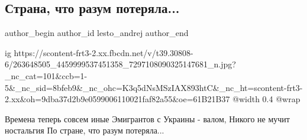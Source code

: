  
 
 
 
 
 
\subsection{Страна, что разум потеряла...}
\label{sec:03_12_2021.fb.lesto_andrej.1.strana_chto_razum_potjerjala}
 
\ifcmt
 author_begin
   author_id lesto_andrej
 author_end
\fi

\ifcmt
  ig https://scontent-frt3-2.xx.fbcdn.net/v/t39.30808-6/263648505_4459999537451358_7297108090325147681_n.jpg?_nc_cat=101&ccb=1-5&_nc_sid=8bfeb9&_nc_ohc=K3q5dNsMSzIAX893htC&_nc_ht=scontent-frt3-2.xx&oh=9dba37d2b9e0599006110021faf82a55&oe=61B21B37
  @width 0.4
  @wrap 
\fi

\obeycr
Времена теперь совсем иные
Эмигрантов с Украины - валом, 
Никого не мучит ностальгия
По стране, что разум потеряла...
\restorecr

